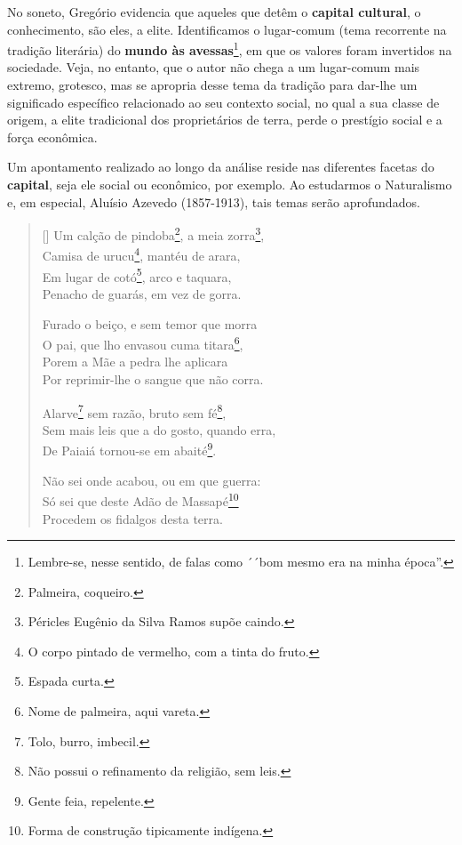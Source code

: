 \documentclass[12pt]{book}
\begin{document}
		\par No soneto, Gregório evidencia que aqueles que detêm o \textbf{capital cultural}, o conhecimento, são eles, a elite. Identificamos o lugar-comum (tema recorrente na tradição literária) do \textbf{mundo às avessas}\footnote{Lembre-se, nesse sentido, de falas como ´´bom mesmo era na minha época''.}, em que os valores foram invertidos na sociedade. Veja, no entanto, que o autor não chega a um lugar-comum mais extremo, grotesco, mas se apropria desse tema da tradição para dar-lhe um significado específico relacionado ao seu contexto social, no qual a sua classe de origem, a elite tradicional dos proprietários de terra, perde o prestígio social e a força econômica.
		\par Um apontamento realizado ao longo da análise reside nas diferentes facetas do \textbf{capital}, seja ele social ou econômico, por exemplo. Ao estudarmos o Naturalismo e, em especial, Aluísio Azevedo (1857-1913), tais temas serão aprofundados.
		\settowidth{\versewidth}{Camisa de urucu, mantéu de arara,}
		\begin{verse}[\versewidth]
			Um calção de pindoba\footnote{Palmeira, coqueiro.}, a meia zorra\footnote{Péricles Eugênio da Silva Ramos supõe caindo.}, \\
			Camisa de urucu\footnote{O corpo pintado de vermelho, com a tinta do fruto.}, mantéu de arara, \\
			Em lugar de cotó\footnote{Espada curta.}, arco e taquara, \\
			Penacho de guarás, em vez de gorra.
			
			Furado o beiço, e sem temor que morra \\
			O pai, que lho envasou cuma titara\footnote{Nome de palmeira, aqui vareta.}, \\	
			Porem a Mãe a pedra lhe aplicara \\
			Por reprimir-lhe o sangue que não corra.
			
			Alarve\footnote{Tolo, burro, imbecil.} sem razão, bruto sem fé\footnote{Não possui o refinamento da religião, sem leis.}, \\
			Sem mais leis que a do gosto, quando erra, \\
			De Paiaiá tornou-se em abaité\footnote{Gente feia, repelente.}.
			
			Não sei onde acabou, ou em que guerra: \\
			Só sei que deste Adão de Massapé\footnote{Forma de construção tipicamente indígena.} \\ 
			Procedem os fidalgos desta terra. 
		\end{verse}
\end{document}
